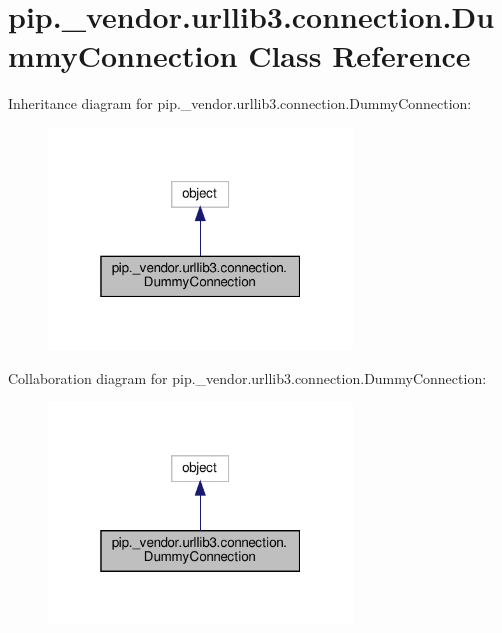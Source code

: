 \hypertarget{classpip_1_1__vendor_1_1urllib3_1_1connection_1_1DummyConnection}{}\section{pip.\+\_\+vendor.\+urllib3.\+connection.\+Dummy\+Connection Class Reference}
\label{classpip_1_1__vendor_1_1urllib3_1_1connection_1_1DummyConnection}


Inheritance diagram for pip.\+\_\+vendor.\+urllib3.\+connection.\+Dummy\+Connection\+:
\nopagebreak
\begin{figure}[H]
\begin{center}
\leavevmode
\includegraphics[width=229pt]{classpip_1_1__vendor_1_1urllib3_1_1connection_1_1DummyConnection__inherit__graph}
\end{center}
\end{figure}


Collaboration diagram for pip.\+\_\+vendor.\+urllib3.\+connection.\+Dummy\+Connection\+:
\nopagebreak
\begin{figure}[H]
\begin{center}
\leavevmode
\includegraphics[width=229pt]{classpip_1_1__vendor_1_1urllib3_1_1connection_1_1DummyConnection__coll__graph}
\end{center}
\end{figure}



